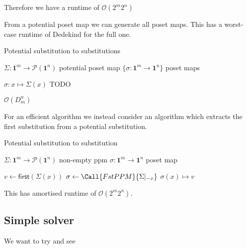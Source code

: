 \documentclass[11pt]{article}
\theoremstyle{definition}
\newcommand{\pint}[1]{\mathbf{1}^{#1}}
\newcommand{\restrict}[2]{{#1}|_{#2}}
\newcommand{\pow}[1]{\mathcal{P}({#1})}
\begin{document}
Therefore we have a runtime of $\mathcal{O}(2^m 2^n)$

From a potential poset map we can generate all poset maps. This has a worst-case
runtime of Dedekind for the full one.


\begin{algorithm}[H]
  \caption{Potential substitution to substitutions}\label{alg:simple}
  \begin{algorithmic}
    \Require $\Sigma : \pint{m} \to \pow{\pint{n}}$ potential poset map
    \Ensure $\{ \sigma : \pint{m} \to \pint{n} \}$ poset maps
    
    \State $\sigma : x \mapsto \Sigma(x) $
    TODO
    \EndProcedure
  \end{algorithmic}
\end{algorithm}

$\mathcal{O}(D_m^n)$

For an efficient algorithm we instead consider an algorithm which extracts the
first substitution from a potential substitution.

\begin{algorithm}[H]
  \caption{Potential substitution to substitution}\label{alg:simple}
  \begin{algorithmic}
    \Require $\Sigma : \pint{m} \to \pow{\pint{n}}$ non-empty ppm
    \Ensure $\sigma : \pint{m} \to \pint{n}$ poset map

    \For{$x \gets \pint{m}$}
    \State $v \gets \mathsf{first}(\Sigma(x))$
    \State $\sigma \gets \Call{FstPPM}{\restrict{\Sigma}{-x}}$
    \State $\sigma(x) \mapsto v$
    \EndFor
    \EndProcedure
  \end{algorithmic}
\end{algorithm}

This has amortised runtime of $\mathcal{O}(2^m 2^n)$.

\subsection{Simple solver}

We want to try and see 
\end{document}
